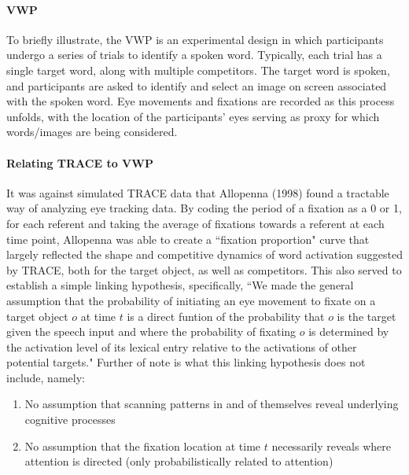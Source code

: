 \documentclass{article}
\begin{document}
\paragraph{VWP} To briefly illustrate, the VWP is an experimental design in which participants undergo a series of trials to identify a spoken word. Typically, each trial has a single target word, along with multiple competitors. The target word is spoken, and participants are asked to identify and select an image on screen associated with the spoken word. Eye movements and fixations are recorded as this process unfolds, with the location of the participants' eyes serving as proxy for which words/images are being considered. 

\paragraph{Relating TRACE to VWP} It was against simulated TRACE data that Allopenna (1998) found a tractable way of analyzing eye tracking data. By coding the period of a fixation as a 0 or 1, for each referent and taking the average of fixations towards a referent at each time point, Allopenna was able to create a ``fixation proportion" curve that largely reflected the shape and competitive dynamics of word activation suggested by TRACE, both for the target object, as well as competitors. This also served to establish a simple linking hypothesis, specifically, ``We made the general assumption that the probability of initiating an eye movement to fixate on a target object $o$ at time $t$ is a direct funtion of the probability that $o$ is the target given the speech input and where the probability of fixating $o$ is determined by the activation level of its lexical entry relative to the activations of other potential targets." Further of note is what this linking hypothesis does not include, namely:

\begin{singlespace}
\begin{enumerate}
\vspace{-3mm}
\item No assumption that scanning patterns in and of themselves reveal underlying cognitive processes
\item No assumption that the fixation location at time $t$ necessarily reveals where attention is directed (only probabilistically related to attention)
\end{enumerate}
\end{singlespace}
\end{document}
